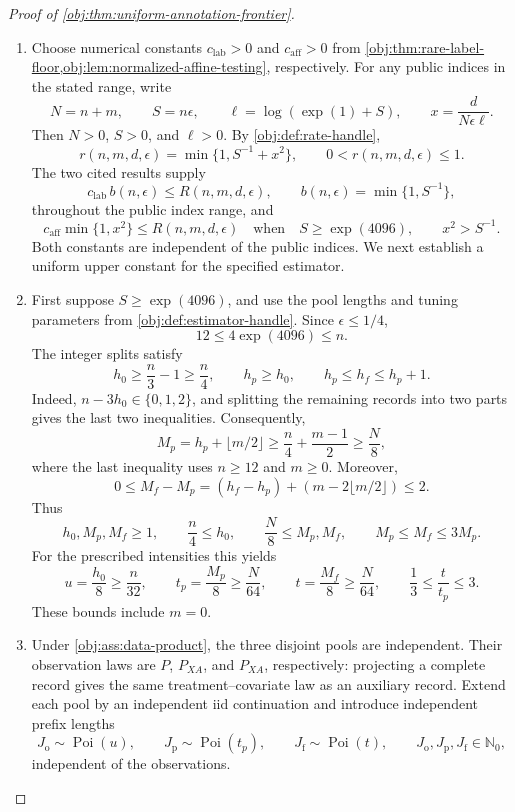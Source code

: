 \begin{proof}[Proof of \cref{obj:thm:uniform-annotation-frontier}]
\begin{enumerate}
\item Choose numerical constants \(c_{\mathrm{lab}}>0\) and \(c_{\mathrm{aff}}>0\) from \cref{obj:thm:rare-label-floor,obj:lem:normalized-affine-testing}, respectively. For any public indices in the stated range, write
\[
N=n+m,\qquad
S=n\epsilon,\qquad
\ell=\log(\exp(1)+S),\qquad
x=\frac{d}{N\epsilon\ell}.
\]
Then \(N>0\), \(S>0\), and \(\ell>0\). By \cref{obj:def:rate-handle},
\[
r(n,m,d,\epsilon)=\min\{1,S^{-1}+x^2\},
\qquad
0<r(n,m,d,\epsilon)\le1.
\]
The two cited results supply
\[
c_{\mathrm{lab}}\,b(n,\epsilon)
\le R(n,m,d,\epsilon),
\qquad
b(n,\epsilon)=\min\{1,S^{-1}\},
\]
throughout the public index range, and
\[
c_{\mathrm{aff}}\min\{1,x^2\}
\le R(n,m,d,\epsilon)
\quad\text{when}\quad
S\ge\exp(4096),\qquad x^2>S^{-1}.
\]
Both constants are independent of the public indices. We next establish a uniform upper constant for the specified estimator.

\item First suppose \(S\ge\exp(4096)\), and use the pool lengths and tuning parameters from \cref{obj:def:estimator-handle}. Since \(\epsilon\le1/4\),
\[
12\le4\exp(4096)\le n.
\]
The integer splits satisfy
\[
h_0\ge\frac n3-1\ge\frac n4,\qquad
h_p\ge h_0,\qquad
h_p\le h_f\le h_p+1.
\]
Indeed, \(n-3h_0\in\{0,1,2\}\), and splitting the remaining records into two parts gives the last two inequalities. Consequently,
\[
M_p
=h_p+\lfloor m/2\rfloor
\ge\frac n4+\frac{m-1}{2}
\ge\frac N8,
\]
where the last inequality uses \(n\ge12\) and \(m\ge0\). Moreover,
\[
0\le M_f-M_p
=(h_f-h_p)+(m-2\lfloor m/2\rfloor)\le2.
\]
Thus
\[
h_0,M_p,M_f\ge1,\qquad
\frac n4\le h_0,\qquad
\frac N8\le M_p,M_f,\qquad
M_p\le M_f\le3M_p.
\]
For the prescribed intensities this yields
\[
u=\frac{h_0}{8}\ge\frac n{32},\qquad
t_p=\frac{M_p}{8}\ge\frac N{64},\qquad
t=\frac{M_f}{8}\ge\frac N{64},\qquad
\frac13\le\frac t{t_p}\le3.
\]
These bounds include \(m=0\).

\item Under \cref{obj:ass:data-product}, the three disjoint pools are independent. Their observation laws are \(P\), \(P_{XA}\), and \(P_{XA}\), respectively: projecting a complete record gives the same treatment--covariate law as an auxiliary record. Extend each pool by an independent iid continuation and introduce independent prefix lengths
\[
J_{\mathrm o}\sim\operatorname{Poi}(u),\qquad
J_{\mathrm p}\sim\operatorname{Poi}(t_p),\qquad
J_{\mathrm f}\sim\operatorname{Poi}(t),
\qquad
J_{\mathrm o},J_{\mathrm p},J_{\mathrm f}\in\mathbb N_0,
\]
independent of the observations.


\end{enumerate}
\end{proof}
